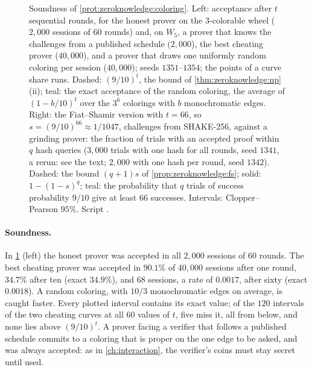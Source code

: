 \begin{refsection}
\begin{figure}[t]
\caption{Soundness of \cref{prot:zeroknowledge:coloring}. Left: acceptance after $t$ sequential rounds, for the honest prover on the 3-colorable wheel ($2{,}000$ sessions of $60$ rounds) and, on $W_5$, a prover that knows the challenges from a published schedule ($2{,}000$), the best cheating prover ($40{,}000$), and a prover that draws one uniformly random coloring per session ($40{,}000$); seeds $1351$--$1354$; the points of a curve share runs. Dashed: $(9/10)^t$, the bound of \cref{thm:zeroknowledge:np}(ii); teal: the exact acceptance of the random coloring, the average of $(1-b/10)^t$ over the $3^6$ colorings with $b$ monochromatic edges. Right: the Fiat--Shamir version with $t=66$, so $s=(9/10)^{66}\approx1/1047$, challenges from SHAKE-256, against a grinding prover: the fraction of trials with an accepted proof within $q$ hash queries ($3{,}000$ trials with one hash for all rounds, seed $1341$, a rerun: see the text; $2{,}000$ with one hash per round, seed $1342$). Dashed: the bound $(q+1)s$ of \cref{prop:zeroknowledge:fs}; solid: $1-(1-s)^q$; teal: the probability that $q$ trials of success probability $9/10$ give at least $66$ successes. Intervals: Clopper--Pearson $95\%$. Script \zeroknowledgescript.}\label{fig:zeroknowledge:runs}
\end{figure}

\paragraph{Soundness.} In \cref{fig:zeroknowledge:runs} (left) the honest prover was accepted in all $2{,}000$ sessions of $60$ rounds. The best cheating prover was accepted in $90.1\%$ of $40{,}000$ sessions after one round, $34.7\%$ after ten (exact $34.9\%$), and $68$ sessions, a rate of $0.0017$, after sixty (exact $0.0018$). A random coloring, with $10/3$ monochromatic edges on average, is caught faster. Every plotted interval contains its exact value; of the $120$ intervals of the two cheating curves at all $60$ values of $t$, five miss it, all from below, and none lies above $(9/10)^t$. A prover facing a verifier that follows a published schedule commits to a coloring that is proper on the one edge to be asked, and was always accepted: as in \cref{ch:interaction}, the verifier's coins must stay secret until used.


\end{refsection}
